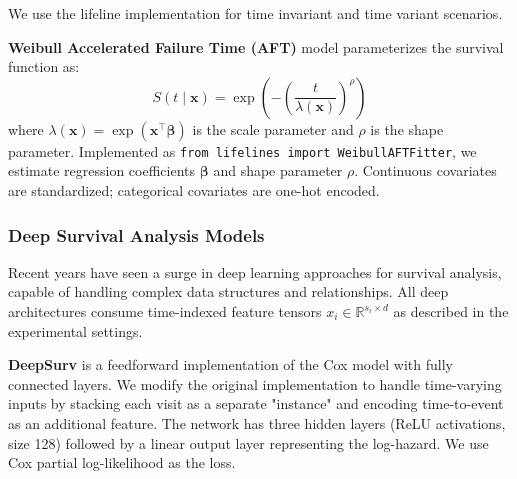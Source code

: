We use the lifeline implementation for time invariant and time variant scenarios.

\textbf{Weibull Accelerated Failure Time (AFT)} model \cite{anderson1991nonproportional_weibull} parameterizes the survival function as:
\[S(t \mid \mathbf{x}) = \exp\left(-\left(\frac{t}{\lambda(\mathbf{x})}\right)^{\rho}\right)\]
where $\lambda(\mathbf{x}) = \exp(\mathbf{x}^\intercal \boldsymbol{\beta})$ is the scale parameter and $\rho$ is the shape parameter. Implemented as \texttt{from lifelines import WeibullAFTFitter}, we estimate regression coefficients $\boldsymbol{\beta}$ and shape parameter $\rho$. Continuous covariates are standardized; categorical covariates are one-hot encoded.


\subsubsection{Deep Survival Analysis Models}

Recent years have seen a surge in deep learning approaches for survival analysis, capable of handling complex data structures and relationships. All deep architectures consume time-indexed feature tensors $x_i \in \mathbb{R}^{s_i\times d}$ as described in the experimental settings.

\textbf{DeepSurv} \cite{katzman2018deepsurv} is a feedforward implementation of the Cox model with fully connected layers. We modify the original implementation to handle time-varying inputs by stacking each visit as a separate "instance" and encoding time-to-event as an additional feature. The network has three hidden layers (ReLU activations, size 128) followed by a linear output layer representing the log-hazard. We use Cox partial log-likelihood as the loss.

